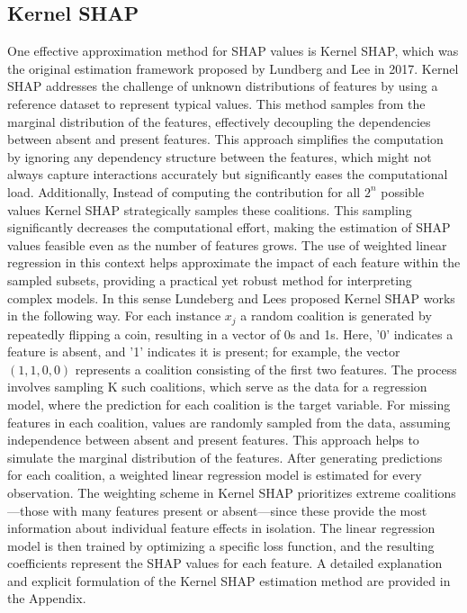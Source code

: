 \documentclass[12pt]{article}
\begin{document}
\subsection{Kernel SHAP}
One effective approximation method for SHAP values is Kernel SHAP, which was the original estimation framework proposed by Lundberg and Lee in 2017. Kernel SHAP addresses the challenge of unknown distributions of features by using a reference dataset to represent typical values. This method samples from the marginal distribution of the features, effectively decoupling the dependencies between absent and present features. This approach simplifies the computation by ignoring any dependency structure between the features, which might not always capture interactions accurately but significantly eases the computational load.
Additionally, Instead of computing the contribution for all $2^n$ possible values Kernel SHAP strategically samples these coalitions. This sampling significantly decreases the computational effort, making the estimation of SHAP values feasible even as the number of features grows. The use of weighted linear regression in this context helps approximate the impact of each feature within the sampled subsets, providing a practical yet robust method for interpreting complex models.
In this sense Lundeberg and Lees proposed Kernel SHAP works in the following way.  
For each instance $x_j$ a random coalition is generated by repeatedly flipping a coin, resulting in a vector of 0s and 1s. Here, '0' indicates a feature is absent, and '1' indicates it is present; for example, the vector $(1,1,0,0)$ represents a coalition consisting of the first two features.
The process involves sampling K such coalitions, which serve as the data for a regression model, where the prediction for each coalition is the target variable. For missing features in each coalition, values are randomly sampled from the data, assuming independence between absent and present features. This approach helps to simulate the marginal distribution of the features.
After generating predictions for each coalition, a weighted linear regression model is estimated for every observation. The weighting scheme in Kernel SHAP prioritizes extreme coalitions—those with many features present or absent—since these provide the most information about individual feature effects in isolation. The linear regression model is then trained by optimizing a specific loss function, and the resulting coefficients represent the SHAP values for each feature.
A detailed explanation and explicit formulation of the Kernel SHAP estimation method are provided in the Appendix.
\end{document}
